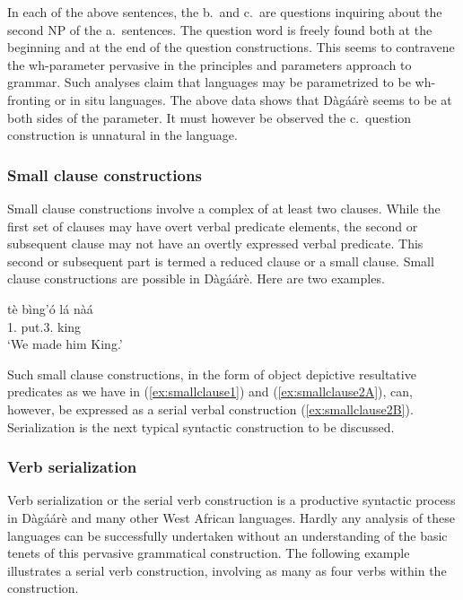 In each of the above sentences, the b.\ and c.\ are questions inquiring about the second NP of
the a.\ sentences. The question word is freely found both at the beginning and at the end of the
question constructions. This seems to contravene the wh-parameter pervasive in the principles
and parameters approach to grammar. Such analyses claim that languages may be
parametrized to be wh-fronting or in situ languages. The above data shows that Dàgáárè seems to be at both sides of the parameter. It must however be observed the c.\ question
construction is unnatural in the language.

\subsubsection{Small clause constructions}
Small clause constructions involve a complex of at least two clauses. While the first
set of clauses may have overt verbal predicate elements, the second or subsequent clause may
not have an overtly expressed verbal predicate. This second or subsequent part is termed a
reduced clause or a small clause. Small clause constructions are possible in Dàgáárè. Here
are two examples.


\ea\label{ex:smallclause1} \gll tè bìng’ó lá nàá\\
1.{\PL} put.3.{\SG} {\FOC} king\\
\glt ‘We made him King.’\z

\ea {}
\z\z

Such small clause constructions, in the form of object depictive resultative predicates as we
have in (\ref{ex:smallclause1}) and (\ref{ex:smallclause2A}), can, however, be expressed as a serial verbal construction (\ref{ex:smallclause2B}).
Serialization is the next typical syntactic construction to be discussed.

\subsubsection{Verb serialization}
Verb serialization or the serial verb construction is a productive syntactic process in
Dàgáárè and many other West African languages. Hardly any analysis of these languages
can be successfully undertaken without an understanding of the basic tenets of this pervasive
grammatical construction. The following example illustrates a serial verb construction,
involving as many as four verbs within the construction.



